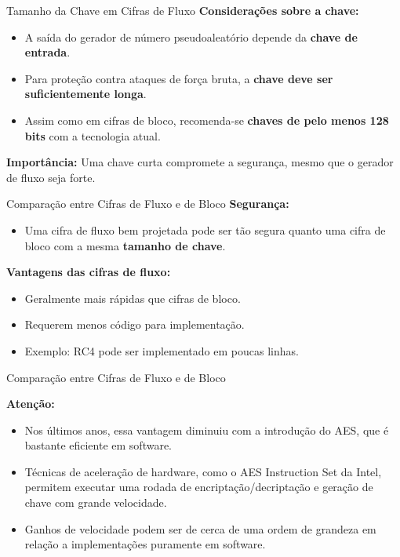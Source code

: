 \begin{frame}{Tamanho da Chave em Cifras de Fluxo}
    \textbf{Considerações sobre a chave:}
    \begin{itemize}
        \item A saída do gerador de número pseudoaleatório depende da \textbf{chave de entrada}.
        \item Para proteção contra ataques de força bruta, a \textbf{chave deve ser suficientemente longa}.
        \item Assim como em cifras de bloco, recomenda-se \textbf{chaves de pelo menos 128 bits} com a tecnologia atual.
    \end{itemize}

    \textbf{Importância:} Uma chave curta compromete a segurança, mesmo que o gerador de fluxo seja forte.
\end{frame}

\begin{frame}{Comparação entre Cifras de Fluxo e de Bloco}
    \textbf{Segurança:}
    \begin{itemize}
        \item Uma cifra de fluxo bem projetada pode ser tão segura quanto uma cifra de bloco com a mesma \textbf{tamanho de chave}.
    \end{itemize}

    \textbf{Vantagens das cifras de fluxo:}
    \begin{itemize}
        \item Geralmente mais rápidas que cifras de bloco.
        \item Requerem menos código para implementação.
        \item Exemplo: RC4 pode ser implementado em poucas linhas.
    \end{itemize}
\end{frame}

\begin{frame}{Comparação entre Cifras de Fluxo e de Bloco}


    \textbf{Atenção:}
    \begin{itemize}
        \item Nos últimos anos, essa vantagem diminuiu com a introdução do AES, que é bastante eficiente em software.
        \item Técnicas de aceleração de hardware, como o AES Instruction Set da Intel, permitem executar uma rodada de encriptação/decriptação e geração de chave com grande velocidade.
        \item Ganhos de velocidade podem ser de cerca de uma ordem de grandeza em relação a implementações puramente em software.
    \end{itemize}
\end{frame}


